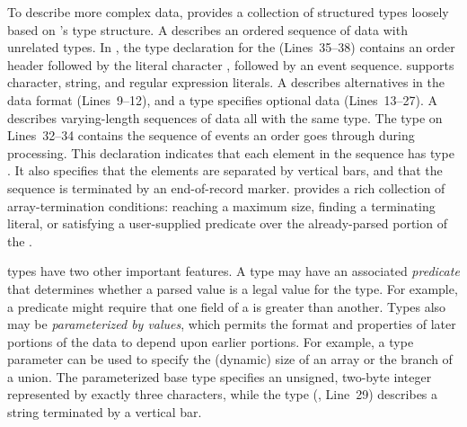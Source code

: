 
To describe more complex data, \pads{} provides a collection of
structured types loosely based on \C{}'s type structure.  A
 describes an ordered sequence of data with unrelated
types.  In , the type declaration for the
  (Lines~35--38) contains an order header
followed by the literal character , followed by an event
sequence. \pads{} supports character, string, and regular expression
literals.  A  describes alternatives in the data format
(Lines~9--12), and a  type specifies optional data
(Lines~13--27).  A  describes varying-length sequences of
data all with the same type.  The  type on Lines~32--34
contains the sequence of events an order goes through during
processing.  This declaration indicates that each element in the
sequence has type .  It also specifies that the elements
are separated by vertical bars, and that the sequence is terminated by
an end-of-record marker.  \pads{} provides a rich collection of
array-termination conditions: reaching a maximum size, finding a
terminating literal, or satisfying a user-supplied predicate over the
already-parsed portion of the .

\pads{} types have two other important features.  A type may have an
associated \emph{predicate} that determines whether a parsed value is
a legal value for the type.  For example, a predicate might require
that one field of a  is greater than another.  Types also
may be \emph{parameterized by values}, which permits the format and
properties of later portions of the data to depend upon earlier
portions.  For example, a type parameter can be used to specify the
(dynamic) size of an array or the branch of a union.  The
parameterized base type  specifies an unsigned,
two-byte integer represented by exactly three characters, while the
type  (\eg{}, Line~29) describes a string
terminated by a vertical bar.



